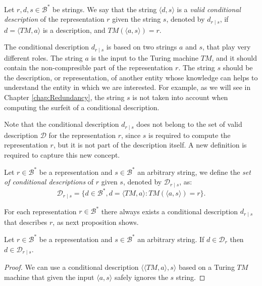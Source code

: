 \begin{definition}
Let $r, d, s \in \mathcal{B}^\ast$ be strings. We say that the string $\langle d, s \rangle$ is a \emph{valid conditional description} of the representation $r$ given the string $s$, denoted by $d_{r \mid s}$, if $d = \langle TM, a \rangle$ is a description, and $TM \left(\langle a, s \rangle \right) = r$.
\end{definition}

The conditional description $d_{r \mid s}$ is based on two strings $a$ and $s$, that play very different roles. The string $a$ is the input to the Turing machine $TM$,  and it should contain the non-compresible part of the representation $r$. The string $s$ should be the description, or representation, of another entity whose knowledge can helps to understand the entity in which we are interested. For example, as we will see in Chapter \ref{chap:Redundancy}, the string $s$ is not taken into account when computing the surfeit of a conditional description.

Note that the conditional description $d_{r \mid s}$ does not belong to the set of valid description $\mathcal{D}$ for the representation $r$, since $s$ is required to compute the representation $r$, but it is not part of the description itself. A new definition is required to capture this new concept.

\begin{definition}
Let $r \in \mathcal{B}^\ast$ be a representation and $s \in \mathcal{B}^\ast$ an arbitrary string, we define the \emph{set of conditional descriptions} of $r$ given $s$, denoted by $\mathcal{D}_{r \mid s}$, as:
\[
\mathcal{D}_{r \mid s} = \{ d \in \mathcal{B}^\ast, d = \langle TM, a \rangle : TM \left(\langle a, s \rangle \right) = r \}.
\]
\end{definition}

For each representation $r \in \mathcal{B}^\ast$ there always exists a conditional description $d_{r \mid s}$ that describes $r$, as next proposition shows.

\begin{proposition}
\label{prop:description_implies_conditional}
Let $r \in \mathcal{B}^\ast$ be a representation and $s \in \mathcal{B}^\ast$ an arbitrary string. If $d \in \mathcal{D}_{r}$ then $d \in \mathcal{D}_{r \mid s}$.
\end{proposition}
\begin{proof}
We can use a conditional description $\langle \langle TM, a \rangle, s \rangle$ based on a Turing $TM$ machine that given the input $\langle a, s \rangle$ safely ignores the $s$ string.
\end{proof}

